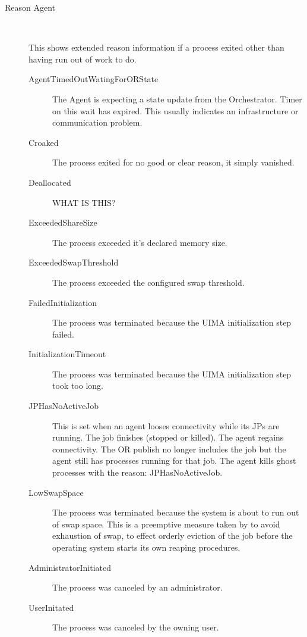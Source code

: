 \begin{description}
          \item[Reason Agent] \hfill \\
          \label{itm:job-details-agent}

          This shows extended reason information if a process exited other than having run out
          of work to do.

            \begin{description}
              \item[AgentTimedOutWatingForORState] The {\DUCC} Agent is expecting a state update
                from the {\DUCC} Orchestrator.  Timer on this wait has expired.  This usually 
                indicates an infrastructure or communication problem.
              \item[Croaked] The process exited for no good or clear reason, it simply vanished.
              \item[Deallocated] WHAT IS THIS?
              \item[ExceededShareSize] The process exceeded it's declared memory size.
              \item[ExceededSwapThreshold] The process exceeded the configured swap threshold.
              \item[FailedInitialization] The process was terminated because the UIMA 
                initialization step failed.
              \item[InitializationTimeout] The process was terminated because the UIMA initialization
                step took too long.
              \item[JPHasNoActiveJob] This is set when an agent looses connectivity while its
                JPs are running. The job finishes (stopped or killed). The agent regains
                connectivity. The OR publish no longer includes the job but the agent still has
                processes running for that job. The agent kills ghost processes with the reason:
                JPHasNoActiveJob.
              \item[LowSwapSpace] The process was terminated because the system is about to run
                out of swap space.  This is a preemptive measure taken by {\DUCC} to avoid exhaustion
                of swap, to effect orderly eviction of the job before the operating system starts
                its own reaping procedures.
              \item[AdministratorInitiated] The process was canceled by an administrator.
              \item[UserInitated] The process was canceled by the owning user.
            \end{description}
                    

\end{description}
